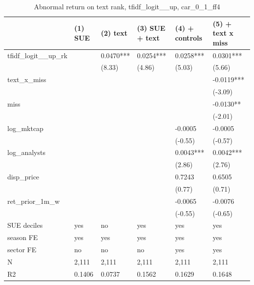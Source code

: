 \begin{table}
\caption{Abnormal return on text rank, tfidf_logit__up, car_0_1_ff4}
\label{tab:t8_regressions__tfidf_logit__up__car_0_1_ff4__validation}
\begin{tabular}{llllll}
\toprule
 & (1) SUE & (2) text & (3) SUE + text & (4) + controls & (5) + text x miss \\
\midrule
tfidf\_logit\_\_up\_rk &  & 0.0470*** & 0.0254*** & 0.0258*** & 0.0301*** \\
 &  & (8.33) & (4.86) & (5.03) & (5.66) \\
text\_x\_miss &  &  &  &  & -0.0119*** \\
 &  &  &  &  & (-3.09) \\
miss &  &  &  &  & -0.0130** \\
 &  &  &  &  & (-2.01) \\
log\_mktcap &  &  &  & -0.0005 & -0.0005 \\
 &  &  &  & (-0.55) & (-0.57) \\
log\_analysts &  &  &  & 0.0043*** & 0.0042*** \\
 &  &  &  & (2.86) & (2.76) \\
disp\_price &  &  &  & 0.7243 & 0.6505 \\
 &  &  &  & (0.77) & (0.71) \\
ret\_prior\_1m\_w &  &  &  & -0.0065 & -0.0076 \\
 &  &  &  & (-0.55) & (-0.65) \\
SUE deciles & yes & no & yes & yes & yes \\
season FE & yes & yes & yes & yes & yes \\
sector FE & no & no & no & yes & yes \\
N & 2,111 & 2,111 & 2,111 & 2,111 & 2,111 \\
R2 & 0.1406 & 0.0737 & 0.1562 & 0.1629 & 0.1648 \\
\bottomrule
\end{tabular}
\end{table}
